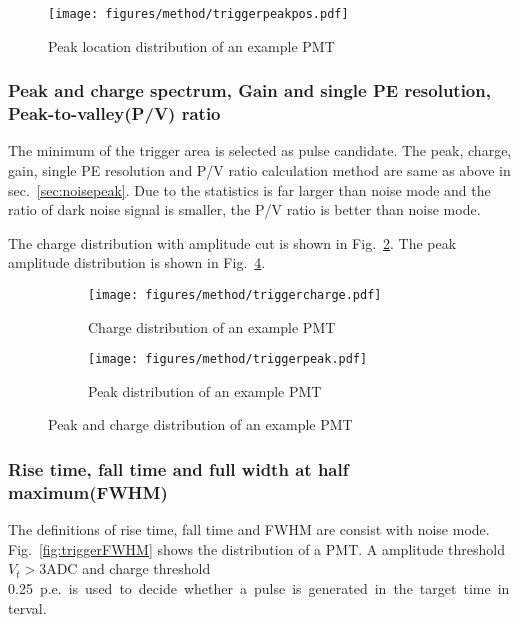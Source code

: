 \begin{figure}[!htbp]
    \centering
    \texttt{[image: figures/method/triggerpeakpos.pdf]}
    \caption{Peak location distribution of an example PMT}%
    \label{fig:peaklocation}
\end{figure}

\subsubsection{Peak and charge spectrum, Gain and single PE resolution, Peak-to-valley(P/V) ratio}
\label{sec:triggerpeak}
The minimum of the trigger area is selected as pulse candidate. The peak, charge, gain, single PE resolution and P/V ratio calculation method are same as above in sec.~\ref{sec:noisepeak}. Due to the statistics is far larger than noise mode and the ratio of dark noise signal is smaller, the P/V ratio is better than noise mode.

The charge distribution with amplitude cut is shown in Fig.~\ref{fig:triggercharge}. The peak amplitude distribution is shown in Fig.~\ref{fig:triggerpeak}. 
\begin{figure}[!htbp]
    \centering
    \begin{subfigure}[b]{0.45\textwidth}
        \texttt{[image: figures/method/triggercharge.pdf]}
        \caption{Charge distribution of an example PMT}%
        \label{fig:triggercharge}
    \end{subfigure}
    \begin{subfigure}[b]{0.45\textwidth}
        \texttt{[image: figures/method/triggerpeak.pdf]}
        \caption{Peak distribution of an example PMT}%
        \label{fig:triggerpeak}
    \end{subfigure}
    \caption{Peak and charge distribution of an example PMT}
\end{figure}

\subsubsection{Rise time, fall time and full width at half maximum(FWHM)}
\label{sec:triggerFWHM}
The definitions of rise time, fall time and FWHM are consist with noise mode. Fig.~\ref{fig:triggerFWHM} shows the distribution of a PMT. A amplitude threshold $V_{t}>3\mathrm{ADC}$ and charge threshold \SI{0.25}{p.e.} is used to decide whether a pulse is generated in the target time interval.
\begin{figure}[!htbp]
    \centering
    
\end{figure}
